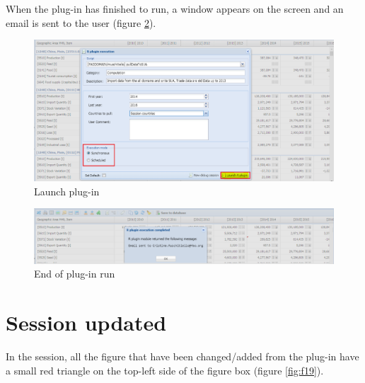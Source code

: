 \documentclass[]{article}
\begin{document}
When the plug-in has finished to run, a window appears on the screen and
an email is sent to the user (figure \ref{fig:f18}).

\begin{figure}[H]

{\centering \includegraphics[width=1\linewidth]{images/pullData/16_launch} 

}

\caption{\label{fig:f16}Launch plug-in}\label{fig:f16}
\end{figure}

\begin{figure}[H]

{\centering \includegraphics[width=1\linewidth]{images/pullData/18_emailSent} 

}

\caption{\label{fig:f18}End of plug-in run}\label{fig:f18}
\end{figure}

\section{Session updated}\label{session-updated}

In the session, all the figure that have been changed/added from the
plug-in have a small red triangle on the top-left side of the figure box
(figure \ref{fig:f19}).
\end{document}
